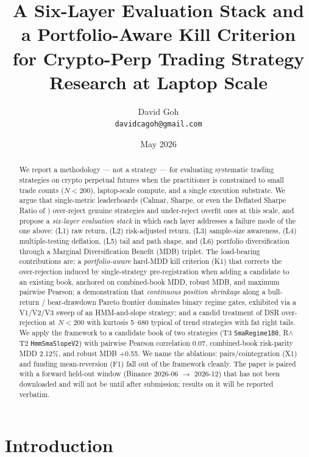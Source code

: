 \documentclass[11pt]{article}
\title{A Six-Layer Evaluation Stack and a Portfolio-Aware Kill Criterion\\
       for Crypto-Perp Trading Strategy Research at Laptop Scale}
\author{David Goh\\
\texttt{davidcagoh@gmail.com}}
\date{May 2026}
\begin{document}
\maketitle

\begin{abstract}
We report a methodology --- not a strategy --- for evaluating systematic trading
strategies on crypto perpetual futures when the practitioner is constrained to
small trade counts ($N{<}200$), laptop-scale compute, and a single execution
substrate. We argue that single-metric leaderboards (Calmar, Sharpe, or even
the Deflated Sharpe Ratio of \citet{lopezdeprado2014dsr}) over-reject genuine
strategies and under-reject overfit ones at this scale, and propose a
\emph{six-layer evaluation stack} in which each layer addresses a failure mode
of the one above: (L1) raw return, (L2) risk-adjusted return, (L3)
sample-size awareness, (L4) multiple-testing deflation, (L5) tail and path
shape, and (L6) portfolio diversification through a Marginal Diversification
Benefit (MDB) triplet. The load-bearing contributions are: a
\emph{portfolio-aware} hard-MDD kill criterion (K1) that corrects the
over-rejection induced by single-strategy pre-registration when adding a
candidate to an existing book, anchored on combined-book MDD, robust MDB, and
maximum pairwise Pearson; a demonstration that \emph{continuous position
shrinkage} along a bull-return / bear-drawdown Pareto frontier dominates
binary regime gates, exhibited via a V1/V2/V3 sweep of an HMM-and-slope
strategy; and a candid treatment of DSR over-rejection at $N{<}200$ with
kurtosis 5--680 typical of trend strategies with fat right tails. We apply
the framework to a candidate book of two strategies (T3 \texttt{SmaRegime180},
R$\wedge$T2 \texttt{HmmSmaSlopeV2}) with pairwise Pearson correlation 0.07,
combined-book risk-parity MDD 2.12\%, and robust MDB +0.55. We name the
ablations: pairs/cointegration (X1) and funding mean-reversion (F1) fall out
of the framework cleanly. The paper is paired with a forward held-out window
(Binance 2026-06 $\to$ 2026-12) that has not been downloaded and will not be
until after submission; results on it will be reported verbatim.
\end{abstract}

\section{Introduction}
\label{sec:intro}
\end{document}
